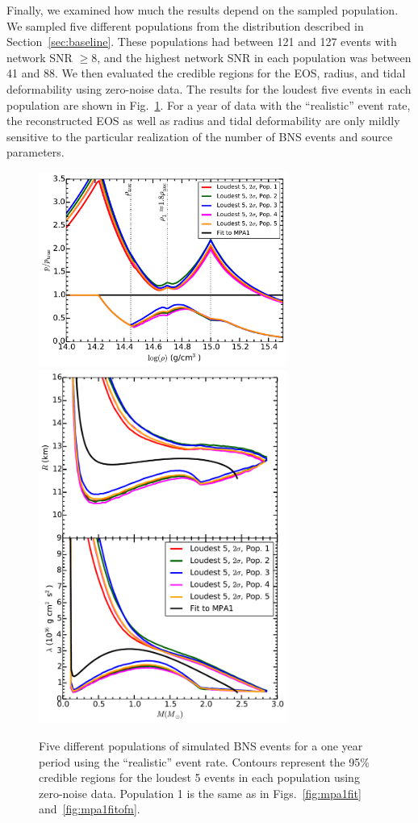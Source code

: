 \documentclass[twocolumn,prd,amssymb,aps,nofootinbib,showpacs,epsf]{revtex4}
\begin{document}
Finally, we examined how much the results depend on the sampled population. We sampled five different populations from the distribution described in Section~\ref{sec:baseline}. These populations had between 121 and 127 events with network SNR $\ge 8$, and the highest network SNR in each population was between 41 and 88. We then evaluated the credible regions for the EOS, radius, and tidal deformability using zero-noise data. The results for the loudest five events in each population are shown in Fig.~\ref{fig:populations}. For a year of data with the ``realistic'' event rate, the reconstructed EOS as well as radius and tidal deformability are only mildly sensitive to the particular realization of the number of BNS events and source parameters.

\begin{figure}[!htb]
\begin{center}
\includegraphics[width=3.2in]{LALMCMCmpa1FitTaylorF2ComparePopperror.pdf}\\
\includegraphics[width=3.2in]{LALMCMCmpa1FitTaylorF2ComparePopRadiuslambda.pdf}\caption{Five different populations of simulated BNS events for a one year period using the ``realistic'' event rate. Contours represent the 95\% credible regions for the loudest 5 events in each population using zero-noise data. Population 1 is the same as in Figs.~\ref{fig:mpa1fit} and~\ref{fig:mpa1fitofn}.}
\label{fig:populations}
\end{center}
\end{figure}
\end{document}
